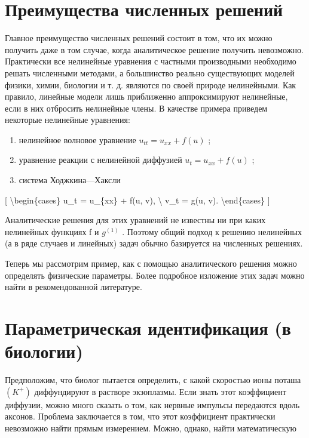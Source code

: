 \documentclass[
]{article}
\begin{document}
\section{Преимущества численных
решений}\label{ux43fux440ux435ux438ux43cux443ux449ux435ux441ux442ux432ux430-ux447ux438ux441ux43bux435ux43dux43dux44bux445-ux440ux435ux448ux435ux43dux438ux439}

Главное преимущество численных решений состоит в том, что их можно
получить даже в том случае, когда аналитическое решение получить
невозможно. Практически все нелинейные уравнения с частными производными
необходимо решать численными методами, а большинство реально
существующих моделей физики, химии, биологии и т. д. являются по своей
природе нелинейными. Как правило, линейные модели лишь приближенно
аппроксимируют нелинейные, если в них отбросить нелинейные члены. В
качестве примера приведем некоторые нелинейные уравнения:

\begin{enumerate}
\def\labelenumi{\arabic{enumi})}
\item
  нелинейное волновое уравнение \(u_{tt} = u_{xx} + f(u)\) ;
\item
  уравнение реакции с нелинейной диффузией \(u_t = u_{xx} + f(u)\) ;
\item
  система Ходжкина---Хаксли
\end{enumerate}

{[} \textbackslash begin\{cases\} u\_t = u\_\{xx\} + f(u, v),
\textbackslash{} v\_t = g(u, v). \textbackslash end\{cases\} {]}

Аналитические решения для этих уравнений не известны ни при каких
нелинейных функциях f и \(g^{(1)}\) . Поэтому общий подход к решению
нелинейных (а в ряде случаев и линейных) задач обычно базируется на
численных решениях.

Теперь мы рассмотрим пример, как с помощью аналитического решения можно
определять физические параметры. Более подробное изложение этих задач
можно найти в рекомендованной литературе.

\section{Параметрическая идентификация (в
биологии)}\label{ux43fux430ux440ux430ux43cux435ux442ux440ux438ux447ux435ux441ux43aux430ux44f-ux438ux434ux435ux43dux442ux438ux444ux438ux43aux430ux446ux438ux44f-ux432-ux431ux438ux43eux43bux43eux433ux438ux438}

Предположим, что биолог пытается определить, с какой скоростью ионы
поташа \((K^+)\) диффундируют в растворе экзоплазмы. Если знать этот
коэффициент диффузии, можно много сказать о том, как нервные импульсы
передаются вдоль аксонов. Проблема заключается в том, что этот
коэффициент практически невозможно найти прямым измерением. Можно,
однако, найти математическую
\end{document}
